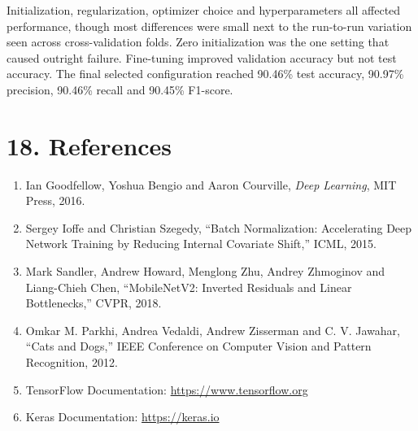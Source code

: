 \documentclass[10pt]{article}
\begin{document}
Initialization, regularization, optimizer choice and hyperparameters all affected performance,
though most differences were small next to the run-to-run variation seen across
cross-validation folds. Zero initialization was the one setting that caused outright failure.
Fine-tuning improved validation accuracy but not test accuracy. The final selected
configuration reached 90.46\% test accuracy, 90.97\% precision, 90.46\% recall and 90.45\%
F1-score.

\section*{18. References}

\begin{enumerate}
\item Ian Goodfellow, Yoshua Bengio and Aaron Courville, \emph{Deep Learning}, MIT Press, 2016.
\item Sergey Ioffe and Christian Szegedy, ``Batch Normalization: Accelerating Deep Network
Training by Reducing Internal Covariate Shift,'' ICML, 2015.
\item Mark Sandler, Andrew Howard, Menglong Zhu, Andrey Zhmoginov and Liang-Chieh Chen,
``MobileNetV2: Inverted Residuals and Linear Bottlenecks,'' CVPR, 2018.
\item Omkar M. Parkhi, Andrea Vedaldi, Andrew Zisserman and C. V. Jawahar, ``Cats and Dogs,''
IEEE Conference on Computer Vision and Pattern Recognition, 2012.
\item TensorFlow Documentation: \url{https://www.tensorflow.org}
\item Keras Documentation: \url{https://keras.io}
\end{enumerate}
\end{document}
